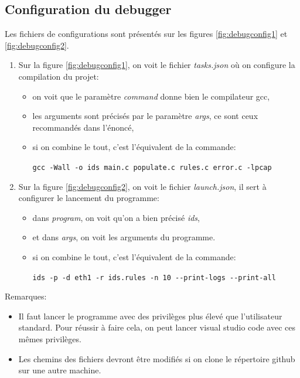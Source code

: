 \documentclass[a4paper]{article}
\begin{document}
\subsection{Configuration du debugger}



Les fichiers de configurations sont présentés sur les figures \ref{fig:debugconfig1} et \ref{fig:debugconfig2}.
\begin{enumerate}
    \item Sur la figure \ref{fig:debugconfig1}, on voit le fichier \textit{tasks.json} où on configure la compilation du projet:
    \begin{itemize}
        \item on voit que le paramètre \textit{command} donne bien le compilateur gcc,
        \item les arguments sont précisés par le paramètre \textit{args}, ce sont ceux recommandés dans l'énoncé,
        \item si on combine le tout, c'est l'équivalent de la commande:
        \begin{center}
            \texttt{\small gcc -Wall -o ids main.c populate.c rules.c error.c -lpcap}
        \end{center}
    \end{itemize}
    \item Sur la figure \ref{fig:debugconfig2}, on voit le fichier \textit{launch.json}, il sert à configurer le lancement du programme:
    \begin{itemize}
        \item dans \textit{program}, on voit qu'on a bien précisé \textit{ids},
        \item et dans \textit{args}, on voit les arguments du programme.
        \item si on combine le tout, c'est l'équivalent de la commande:
        \begin{center}
            \texttt{\small ids -p -d eth1 -r ids.rules -n 10 -{}-print-logs -{}-print-all}
        \end{center}
    \end{itemize}
\end{enumerate}
Remarques:
\begin{itemize}
    \item Il faut lancer le programme avec des privilèges plus élevé que l'utilisateur standard. Pour réussir à faire cela, on peut lancer visual studio code avec ces mêmes privilèges.
    \item Les chemins des fichiers devront être modifiés si on clone le répertoire github sur une autre machine.
\end{itemize}
\end{document}
